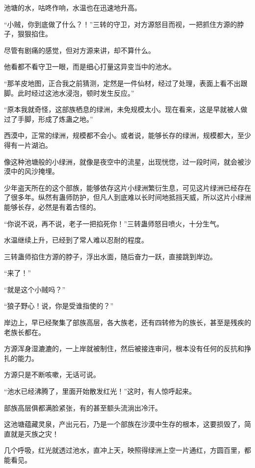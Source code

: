 
\begin{this_body}

池塘的水，咕咚作响，水温也在迅速地升高。

“小贼，你到底做了什么？！”三转的守卫，对方源怒目而视，一把抓住方源的脖子，狠狠掐住。

尽管有剧痛的感觉，但对方源来讲，却不算什么。

他看都不看守卫一眼，而是细心打量这异变当中的池水。

“那羊皮地图，正合我之前猜测，定然是一件仙材，经过了处理，表面上看不出跟脚。此时经过这池水浸泡，顿时发生反应。”

“原本我就奇怪，这部族栖息的绿洲，未免规模太小。现在看来，这是早就被人做过了手脚，形成了炼蛊之地。”

西漠中，正常的绿洲，规模都不会小。或者说，能够长存的绿洲，规模都大，至少得有一片湖泊。

像这种池塘般的小绿洲，就像是夜空中的流星，出现恍惚，过一段时间，就会被沙漠中的风沙掩埋。

少年盗天所在的这个部族，能够依存这片小绿洲繁衍生息，可见这片绿洲已经存在了很多年。纵然有蛊师防护，但凡人到底难以长时间地抵挡天威，所以这片小绿洲能够长存，必然是有着古怪的。

“你说不说，再不说，老子一把掐死你！”三转蛊师怒目喷火，十分生气。

水温继续上升，已经到了常人难以忍耐的程度。

三转蛊师掐住方源的脖子，浮出水面，随后奋力一跃，直接跳到岸边。

“来了！”

“就是这个小贼吗？”

“狼子野心！说，你是受谁指使的？”

岸边上，早已经聚集了部族高层，各大族老，还有四转修为的族长，甚至是残疾的老族长都在。

方源浑身湿漉漉的，一上岸就被制住，然后被接连审问，根本没有任何的反抗和挣扎的能力。

方源只是不断咳嗽，无话可说。

“池水已经沸腾了，里面开始散发红光！”这时，有人惊呼起来。

部族高层俱都满脸紧张，有的甚至额头流淌出冷汗。

这池塘蕴藏灵泉，产出元石，乃是一个部族在沙漠中生存的根本，这要损毁了，简直就是灭族之灾！

几个呼吸，红光就透过池水，直冲上天，映照得绿洲上空一片通红，方圆百里，都能看见。


\end{this_body}
